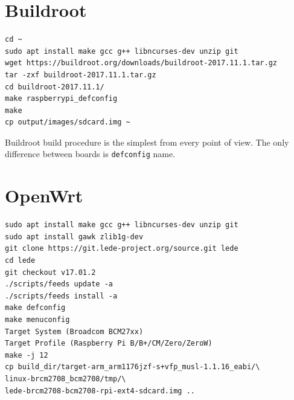 \documentclass[printmode]{mgr}
\begin{document}
\section{Buildroot}


\begin{lstlisting}
cd ~
sudo apt install make gcc g++ libncurses-dev unzip git 
wget https://buildroot.org/downloads/buildroot-2017.11.1.tar.gz
tar -zxf buildroot-2017.11.1.tar.gz
cd buildroot-2017.11.1/
make raspberrypi_defconfig
make
cp output/images/sdcard.img ~
\end{lstlisting}


Buildroot build procedure is the simplest from every point of view.
The only difference between boards is \verb|defconfig| name.







\section{OpenWrt}

\begin{lstlisting}
sudo apt install make gcc g++ libncurses-dev unzip git
sudo apt install gawk zlib1g-dev
git clone https://git.lede-project.org/source.git lede
cd lede
git checkout v17.01.2
./scripts/feeds update -a
./scripts/feeds install -a
make defconfig
make menuconfig
Target System (Broadcom BCM27xx)
Target Profile (Raspberry Pi B/B+/CM/Zero/ZeroW)
make -j 12
cp build_dir/target-arm_arm1176jzf-s+vfp_musl-1.1.16_eabi/\
linux-brcm2708_bcm2708/tmp/\
lede-brcm2708-bcm2708-rpi-ext4-sdcard.img ..
\end{lstlisting}
\end{document}

